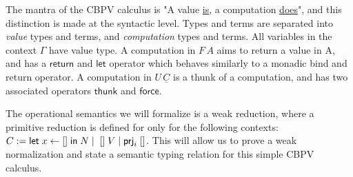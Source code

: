 \documentclass[11pt,twoside]{article}
\begin{document}
The mantra of the CBPV calculus is "A value \underline{is}, a computation \underline{does}", and this distinction is made at the syntactic level.
Types and terms are separated into \textit{value} types and terms, and \textit{computation} types and terms.
All variables in the context $\Gamma$ have value type.
A computation in $F \, A$ aims to return a value in A, and has a $\mathsf{return}$ and $\mathsf{let}$ operator which behaves similarly to a monadic bind and return operator. 
A computation in $U \, \underline{C}$ is a thunk of a computation, and has two associated operators $\mathsf{thunk}$ and $\mathsf{force}$.

The operational semantics we will formalize is a weak reduction, where a primitive reduction is defined for only for the following contexts:
$ C := \mathsf{let} \; x \leftarrow [] \; \mathsf{in} \; N \;|\;  \; [] \;V \;|\; \mathsf{prj}_i \; []$.
This will allow us to prove a weak normalization and state a semantic typing relation for this simple CBPV calculus.



\end{document}

